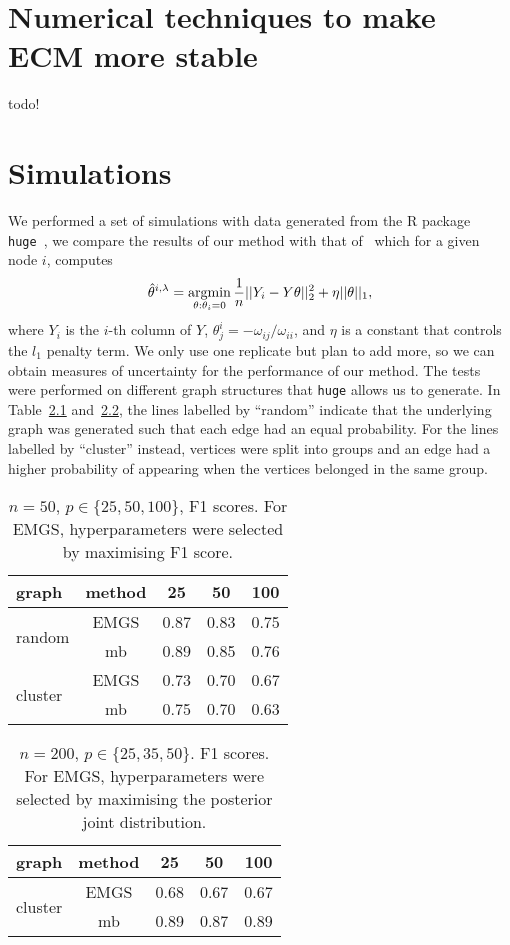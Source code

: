 \documentclass[a4paper, 11pt, oneside]{report}
\DeclareMathOperator{\argmin}{argmin}
\newcommand{\1}{\mathds{1}}
\begin{document}
\chapter{Numerical techniques to make ECM more stable}
todo!

\chapter{Simulations}
We performed a set of simulations with data generated from the R package
\texttt{huge}~\parencite{huge2020}, we compare the results of our method with that of~\cite{mein2006} which for a given node $i$, computes
\[\hat{\theta}^{i, \lambda} = \argmin\displaylimits_{\theta : \theta_i = 0}\frac{1}{n} ||Y_i - Y \theta||_2^2 + \eta ||\theta||_1,\]
where $Y_i$ is the $i$-th column of $Y$, $\theta_j^i = -\omega_{ij}/\omega_{ii}$, and $\eta$ is a constant that controls the $l_1$ penalty term.
We only use one replicate but plan to add more, so we can obtain measures of uncertainty for the performance of our method.
The tests were performed on different graph structures that \texttt{huge} allows us to generate.
In Table~\ref{tab:cheat} and~\ref{tab:honest}, the lines labelled by ``random'' indicate that the
underlying graph was generated such that each edge had an equal probability. For the lines labelled by ``cluster'' instead, vertices were split
into groups and an edge had a higher probability of appearing when the vertices
belonged in the same group.
\begin{table}
	\centering
	\small
	\begin{tabular}{lcccc}
		\toprule
		graph                    & method & 25   & 50   & 100  \\
		\midrule
		\multirow{2}{*}{random}  & EMGS   & 0.87 & 0.83 & 0.75 \\
		                         & mb     & 0.89 & 0.85 & 0.76 \\
		\midrule
		\multirow{2}{*}{cluster} & EMGS   & 0.73 & 0.70 & 0.67 \\
		                         & mb     & 0.75 & 0.70 & 0.63 \\
		\bottomrule
	\end{tabular}
	\caption{$n=50$, $p \in \{25, 50, 100\}$, F1 scores. For EMGS, hyperparameters were selected by maximising F1 score.}\label{tab:cheat}
\end{table}
\begin{table}
	\centering
	\small
	\begin{tabular}{lcccc}
		\toprule
		graph                    & method & 25   & 50   & 100  \\
		\midrule
		\multirow{2}{*}{cluster} & EMGS   & 0.68 & 0.67 & 0.67 \\
		                         & mb     & 0.89 & 0.87 & 0.89 \\
		\bottomrule
	\end{tabular}
	\caption{$n=200$, $p \in \{25, 35, 50\}$. F1 scores. For EMGS, hyperparameters were selected by maximising the posterior joint distribution.}\label{tab:honest}
\end{table}
\end{document}
